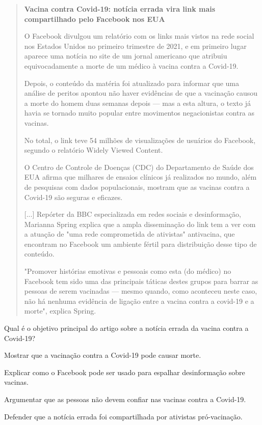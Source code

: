 \begin{quote}
\textbf{Vacina contra Covid-19: notícia errada vira link mais
compartilhado pelo Facebook nos EUA}

O Facebook divulgou um relatório com os links mais vistos na rede social
nos Estados Unidos no primeiro trimestre de 2021, e em primeiro lugar
aparece uma notícia no site de um jornal americano que atribuiu
equivocadamente a morte de um médico à vacina contra a Covid-19.

Depois, o conteúdo da matéria foi atualizado para informar que uma
análise de peritos apontou não haver evidências de que a vacinação
causou a morte do homem duas semanas depois --- mas a esta altura, o
texto já havia se tornado muito popular entre movimentos negacionistas
contra as vacinas.

No total, o link teve 54 milhões de visualizações de usuários do
Facebook, segundo o relatório Widely Viewed Content.

O Centro de Controle de Doenças (CDC) do Departamento de Saúde dos EUA
afirma que milhares de ensaios clínicos já realizados no mundo, além de
pesquisas com dados populacionais, mostram que as vacinas contra a
Covid-19 são seguras e eficazes.

{[}...{]} Repórter da BBC especializada em redes sociais e
desinformação, Marianna Spring explica que a ampla disseminação do link
tem a ver com a atuação de "uma rede comprometida de ativistas"
antivacina, que encontram no Facebook um ambiente fértil para
distribuição desse tipo de conteúdo.

"Promover histórias emotivas e pessoais como esta (do médico) no
Facebook tem sido uma das principais táticas destes grupos para barrar
as pessoas de serem vacinadas --- mesmo quando, como aconteceu neste
caso, não há nenhuma evidência de ligação entre a vacina contra a
covid-19 e a morte", explica Spring.

\end{quote}

Qual é o objetivo principal do artigo sobre a notícia errada da vacina
contra a Covid-19?

\begin{escolha}
\item Mostrar que a vacinação contra a Covid-19 pode causar morte.

\item Explicar como o Facebook pode ser usado para espalhar desinformação sobre vacinas.

\item Argumentar que as pessoas não devem confiar nas vacinas contra a Covid-19.

\item Defender que a notícia errada foi compartilhada por ativistas pró-vacinação.
\end{escolha}

